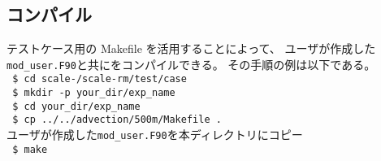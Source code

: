 \subsection{コンパイル}
テストケース用の Makefile を活用することによって、
ユーザが作成した\verb|mod_user.F90|と共に{\scalerm}をコンパイルできる。
その手順の例は以下である。\\
\texttt{ \$ cd scale-\version/scale-rm/test/case}\\
\texttt{ \$ mkdir -p your\_dir/exp\_name}\\
\texttt{ \$ cd your\_dir/exp\_name}\\
\texttt{ \$ cp ../../advection/500m/Makefile .}\\
\noindent ユーザが作成した\verb|mod_user.F90|を本ディレクトリにコピー \\
\texttt{ \$ make}
